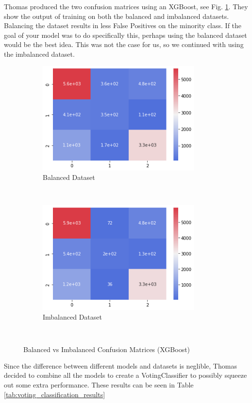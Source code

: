 \documentclass[conference]{IEEEtran}
\begin{document}
Thomas produced the two confusion matrices using an XGBoost, see Fig. \ref{fig:confusion_matrices}. They show the output of training on both the balanced and imbalanced datasets. Balancing the dataset results in less False Positives on the minority class. If the goal of your model was to do specifically this, perhaps using the balanced dataset would be the best idea. This was not the case for us, so we continued with using the imbalanced dataset.

\begin{figure}
  \centering
  \begin{subfigure}[t]{0.5\textwidth}
      \centering
      \includegraphics[height=2.25in]{figures/cm_balanced}
      \caption{Balanced Dataset}
  \end{subfigure}%
  ~
  \begin{subfigure}[t]{0.5\textwidth}
      \centering
      \includegraphics[height=2.25in]{figures/cm_imbalanced}
      \caption{Imbalanced Dataset}
  \end{subfigure}
  ~
  \caption{Balanced vs Imbalanced Confusion Matrices (XGBoost)}
  \label{fig:confusion_matrices}
\end{figure}

Since the difference between different models and datasets is neglible, Thomas decided to combine all the models to create a VotingClassifier to possibly squeeze out some extra performance. These results can be seen in Table \ref{tab:voting_classification_results}
\end{document}
